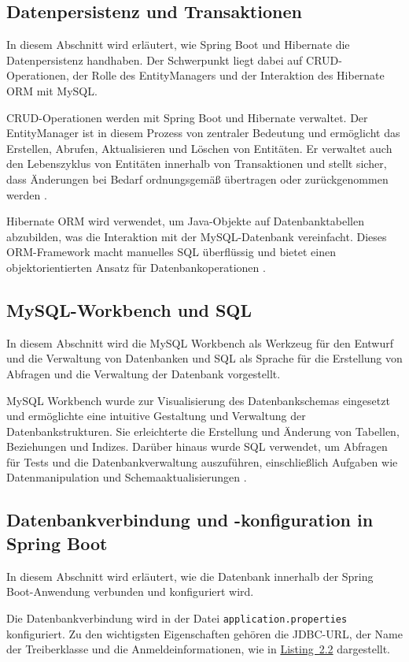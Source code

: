 \subsection{Datenpersistenz und Transaktionen}
In diesem Abschnitt wird erläutert, wie Spring Boot und Hibernate die Datenpersistenz handhaben. Der Schwerpunkt liegt dabei auf CRUD-Operationen, der Rolle des EntityManagers und der Interaktion des Hibernate ORM mit MySQL.

CRUD-Operationen werden mit Spring Boot und Hibernate verwaltet. Der EntityManager ist in diesem Prozess von zentraler Bedeutung und ermöglicht das Erstellen, Abrufen, Aktualisieren und Löschen von Entitäten. Er verwaltet auch den Lebenszyklus von Entitäten innerhalb von Transaktionen und stellt sicher, dass Änderungen bei Bedarf ordnungsgemäß übertragen oder zurückgenommen werden  \cite{Baeldung-EntityManager:2024}.


Hibernate ORM wird verwendet, um Java-Objekte auf Datenbanktabellen abzubilden, was die Interaktion mit der MySQL-Datenbank vereinfacht. Dieses ORM-Framework macht manuelles SQL überflüssig und bietet einen objektorientierten Ansatz für Datenbankoperationen \cite{Hibernate:o.J}.


\subsection{MySQL-Workbench und SQL}
In diesem Abschnitt wird die MySQL Workbench als Werkzeug für den Entwurf und die Verwaltung von Datenbanken und SQL als Sprache für die Erstellung von Abfragen und die Verwaltung der Datenbank vorgestellt.

MySQL Workbench wurde zur Visualisierung des Datenbankschemas eingesetzt und ermöglichte eine intuitive Gestaltung und Verwaltung der Datenbankstrukturen. Sie erleichterte die Erstellung und Änderung von Tabellen, Beziehungen und Indizes. Darüber hinaus wurde SQL verwendet, um Abfragen für Tests und die Datenbankverwaltung auszuführen, einschließlich Aufgaben wie Datenmanipulation und Schemaaktualisierungen \cite{mySQL:o.J}.

\subsection{Datenbankverbindung und -konfiguration in Spring Boot}
In diesem Abschnitt wird erläutert, wie die Datenbank innerhalb der Spring Boot-Anwendung verbunden und konfiguriert wird.

Die Datenbankverbindung wird in der Datei \texttt{application.properties} konfiguriert. Zu den wichtigsten Eigenschaften gehören die JDBC-URL, der Name der Treiberklasse und die Anmeldeinformationen, wie in \hyperref[Application.properties]{Listing~2.2} dargestellt.

